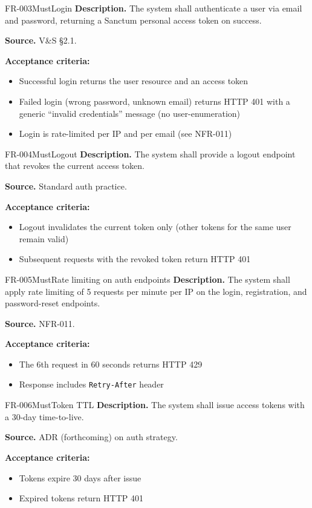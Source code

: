 \documentclass[11pt,a4paper]{article}
\begin{document}
\begin{requirement}{FR-003}{Must}{Login}
\textbf{Description.} The system shall authenticate a user via email and password, returning a Sanctum personal access token on success.

\textbf{Source.} V\&S \S2.1.

\textbf{Acceptance criteria:}
\begin{itemize}
    \item Successful login returns the user resource and an access token
    \item Failed login (wrong password, unknown email) returns HTTP 401 with a generic ``invalid credentials'' message (no user-enumeration)
    \item Login is rate-limited per IP and per email (see NFR-011)
\end{itemize}
\end{requirement}

\begin{requirement}{FR-004}{Must}{Logout}
\textbf{Description.} The system shall provide a logout endpoint that revokes the current access token.

\textbf{Source.} Standard auth practice.

\textbf{Acceptance criteria:}
\begin{itemize}
    \item Logout invalidates the current token only (other tokens for the same user remain valid)
    \item Subsequent requests with the revoked token return HTTP 401
\end{itemize}
\end{requirement}

\begin{requirement}{FR-005}{Must}{Rate limiting on auth endpoints}
\textbf{Description.} The system shall apply rate limiting of 5 requests per minute per IP on the login, registration, and password-reset endpoints.

\textbf{Source.} NFR-011.

\textbf{Acceptance criteria:}
\begin{itemize}
    \item The 6th request in 60 seconds returns HTTP 429
    \item Response includes \texttt{Retry-After} header
\end{itemize}
\end{requirement}

\begin{requirement}{FR-006}{Must}{Token TTL}
\textbf{Description.} The system shall issue access tokens with a 30-day time-to-live.

\textbf{Source.} ADR (forthcoming) on auth strategy.

\textbf{Acceptance criteria:}
\begin{itemize}
    \item Tokens expire 30 days after issue
    \item Expired tokens return HTTP 401
\end{itemize}
\end{requirement}
\end{document}
